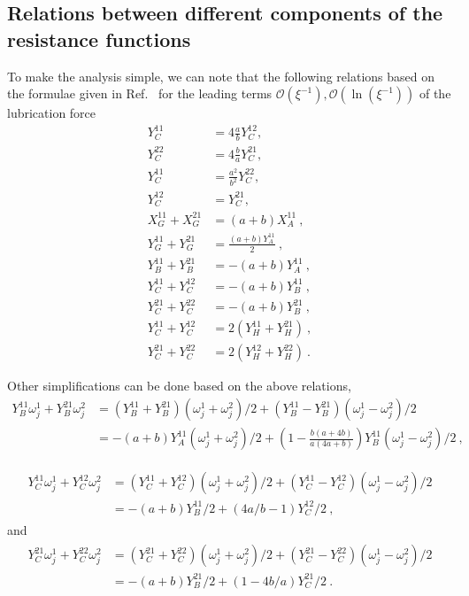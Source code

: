 \documentclass[reprint, amsmath,amssymb,aps,pre,onecolumn,notitlepage%
]{revtex4-1}
\begin{document}
\subsection{Relations between different components of the resistance functions}

To make the analysis simple, we can note that the following relations based on the formulae given in Ref.~\cite{KK1991} for the leading terms $\mathcal{O}(\xi^{-1}),\mathcal{O}(\ln(\xi^{-1}))$ of the lubrication force
\begin{equation}
\begin{split}
	Y^{11}_C &=4\frac{a}{b}Y^{12}_C,\\
	Y^{22}_C &=4\frac{b}{a}Y^{21}_C,\\ 
	Y^{11}_C &=\frac{a^2}{b^2}Y^{22}_C,\\
	Y^{12}_C &=Y^{21}_C,\\
	X^{11}_G+ X^{21}_G&=(a+b)X_A^{11} \ , \\
	Y^{11}_G+ Y^{21}_G&=\frac{(a+b)Y_A^{11}}{2} \ , \\
	Y^{11}_B+ Y^{21}_B&=-(a+b)Y_A^{11} \ ,\\ 
	Y^{11}_C+ Y^{12}_C&=-(a+b)Y^{11}_B\ , \\ 
	Y^{21}_C+ Y^{22}_C&=-(a+b)Y^{21}_B\ ,\\ 
	Y^{11}_C+ Y^{12}_C&=2(Y^{11}_H+Y^{21}_H) \ , \\
	Y^{21}_C+ Y^{22}_C&=2(Y^{12}_H+Y^{22}_H) \ . 
\label{eq:relations}
\end{split}
\end{equation}

Other simplifications can be done based on the above relations, 
\begin{align}
	Y_B^{11}\omega^1_j+Y_B^{21}\omega^2_j&=(Y_B^{11}+Y_B^{21})(\omega_j^1+\omega^2_j)/2+(Y_B^{11}-Y_B^{21})(\omega_j^1-\omega^2_j)/2\\
	&=-(a+b)Y_A^{11}(\omega_j^1+\omega^2_j)/2+(1-\frac{b(a+4b)}{a(4 a +b)})Y_B^{11}(\omega_j^1-\omega^2_j)/2\ ,
	\label{eq:ybsimp}
\end{align}

\begin{align}
\begin{split}
Y_C^{11}\omega^1_j+Y_C^{12}\omega^2_j&=(Y_C^{11}+Y_C^{12})(\omega^1_j+\omega^2_j)/2+(Y_C^{11}-Y_C^{12})(\omega^1_j-\omega^2_j)/2\\
&=-(a+b)Y_B^{11}/2+(4a/b-1)Y_C^{12}/2 \ ,
\end{split}
	\label{eq:ycsimp}
\end{align}
and
\begin{align}
\begin{split}
Y_C^{21}\omega^1_j+Y_C^{22}\omega^2_j&=(Y_C^{21}+Y_C^{22})(\omega^1_j+\omega^2_j)/2+(Y_C^{21}-Y_C^{22})(\omega^1_j-\omega^2_j)/2\\
&=-(a+b)Y_B^{21}/2+(1-4b/a)Y_C^{21}/2 \ .
\end{split}
	\label{eq:ycsimp2}
\end{align}
\end{document}

